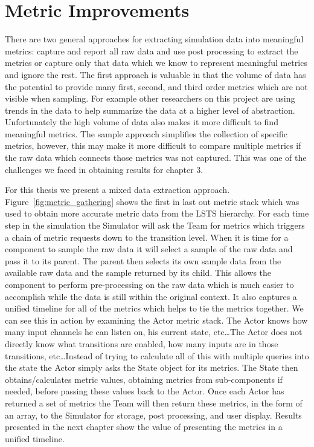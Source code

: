 \chapter{Metric Improvements}

There are two general approaches for extracting simulation data into meaningful metrics: capture and report all raw data and use post processing to extract the metrics or capture only that data which we know to represent meaningful metrics and ignore the rest.  The first approach is valuable in that the volume of data has the potential to provide many first, second, and third order metrics which are not visible when sampling.  For example other researchers on this project are using trends in the data to help summarize the data at a higher level of abstraction.  Unfortunately the high volume of data also makes it more difficult to find meaningful metrics.  The sample approach simplifies the collection of specific metrics, however, this may make it more difficult to compare multiple metrics if the raw data which connects those metrics was not captured.  This was one of the challenges we faced in obtaining results for chapter 3.

For this thesis we present a mixed data extraction approach.  Figure~\ref{fig:metric_gathering} shows the first in last out metric stack which was used to obtain more accurate metric data from the LSTS hierarchy.  For each time step in the simulation the Simulator will ask the Team for metrics which triggers a chain of metric requests down to the transition level.  When it is time for a component to sample the raw data it will select a sample of the raw data and pass it to its parent.  The parent then selects its own sample data from the available raw data and the sample returned by its child.  This allows the component to perform pre-processing on the raw data which is much easier to accomplish while the data is still within the original context.  It also captures a unified timeline for all of the metrics which helps to tie the metrics together.  We can see this in action by examining the Actor metric stack.  The Actor knows how many input channels he can listen on, his current state, etc\ldots  The Actor does not directly know what transitions are enabled, how many inputs are in those transitions, etc\ldots  Instead of trying to calculate all of this with multiple queries into the state the Actor simply asks the State object for its metrics.  The State then obtains/calculates metric values, obtaining metrics from sub-components if needed, before passing these values back to the Actor.  Once each Actor has returned a set of metrics the Team will then return these metrics, in the form of an array, to the Simulator for storage, post processing, and user display.  Results presented in the next chapter show the value of presenting the metrics in a unified timeline.

